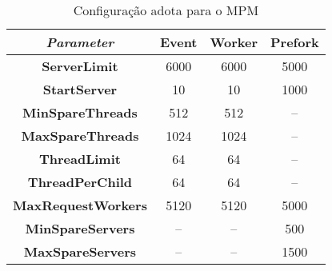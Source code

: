 \begin{table}
  \centering
  \begin{tabular}{|c|c|c|c|}
  \hline
    \textit{Parameter} & \textbf{Event} & \textbf{Worker} & \textbf{Prefork} \\
      \hline\hline
    \textbf{ServerLimit} & 6000 & 6000 & 5000\\
      \hline
    \textbf{StartServer} & 10 & 10 & 1000\\
      \hline
    \textbf{MinSpareThreads} & 512 & 512 & --\\
      \hline
    \textbf{MaxSpareThreads} & 1024 & 1024 & --\\
      \hline
    \textbf{ThreadLimit} & 64 & 64 & --\\
      \hline
    \textbf{ThreadPerChild} & 64 & 64 & --\\
      \hline
    \textbf{MaxRequestWorkers} & 5120 & 5120 & 5000\\
      \hline
    \textbf{MinSpareServers} & -- & -- & 500\\
      \hline
    \textbf{MaxSpareServers} & -- & -- & 1500\\
      \hline
  \end{tabular}

  \caption{Configuração adota para o MPM}
  \label{tab:configuration}

\end{table}

